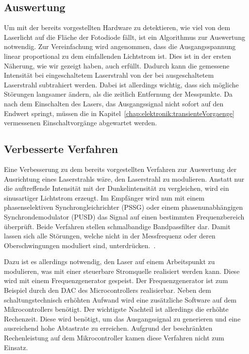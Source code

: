 \subsection{Auswertung}
\label{chap:elektronik:auswertung}
Um mit der bereits vorgestellten Hardware zu detektieren, wie viel von dem Laserlicht auf die Fläche der Fotodiode fällt, ist ein Algorithmus zur Auswertung notwendig.
Zur Vereinfachung wird angenommen, dass die Ausgangsspannung linear proportional zu dem einfallenden Lichtstrom ist.
Dies ist in der ersten Näherung, wie wir gezeigt haben, auch erfüllt.
Dadurch kann die gemessene Intensität bei eingeschaltetem Laserstrahl von der bei ausgeschaltetem Laserstrahl subtrahiert werden.
Dabei ist allerdings wichtig, dass sich mögliche Störungen langsamer ändern, als die zeitlich Entfernung der Messpunkte.
Da nach dem Einschalten des Lasers, das Ausgangssignal nicht sofort auf den Endwert springt, müssen die in Kapitel~\ref{chap:elektronik:transienteVorgaenge} vermessenen Einschaltvorgänge abgewartet werden.


\subsection{Verbesserte Verfahren}
Eine Verbesserung zu dem bereits vorgestellten Verfahren zur Auswertung der Ausrichtung eines Laserstrahls wäre, den Laserstrahl zu modulieren.
Anstatt nur die auftreffende Intensität mit der Dunkelintensität zu vergleichen, wird ein sinusartiger Lichtstrom erzeugt.
Im Empfänger wird nun mit einem phasenselektiven Synchrongleichrichter (PSSG) oder einem phasenunabhängigen Synchrondemodulator (PUSD) das Signal auf einen bestimmten Frequenzbereich überprüft.
Beide Verfahren stellen schmalbandige Bandpassfilter dar.
Damit lassen sich alle Störungen, welche nicht in der Messfrequenz oder deren Oberschwingungen moduliert sind, unterdrücken.~\cite[210]{book:elektrischeMesstechnik}.

Dazu ist es allerdings notwendig, den Laser auf einem Arbeitspunkt zu modulieren, was mit einer steuerbare Stromquelle realisiert werden kann.
Diese wird mit einem Frequenzgenerator gespeist.
Der Frequenzgenerator ist zum Beispiel durch den DAC des Microcontrollers realisierbar.
Neben dem schaltungstechnisch erhöhten Aufwand wird eine zusätzliche Software auf dem Mikrocontrollers benötigt.
Der wichtigste Nachteil ist allerdings die erhöhte Rechenzeit.
Diese wird benötigt, um das Ausgangssignal zu generieren und eine ausreichend hohe Abtastrate zu erreichen.
Aufgrund der beschränkten Rechenleistung auf dem Mikrocontroller kamen diese Verfahren nicht zum Einsatz.
